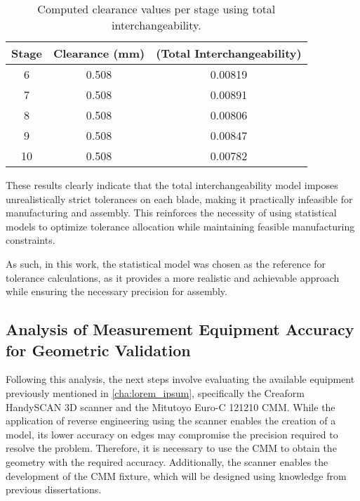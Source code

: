 \begin{table}[h]
    \centering
    \begin{tabular}{@{}ccc@{}}
        \toprule
        Stage & Clearance (mm) &  \newline (Total Interchangeability) \\
        \midrule
        6  & 0.508 & 0.00819    \\
        7  & 0.508 & 0.00891    \\
        8  & 0.508 & 0.00806    \\
        9  & 0.508 & 0.00847    \\
        10 & 0.508 & 0.00782    \\
        \bottomrule
    \end{tabular}
    \caption{Computed clearance values per stage using total interchangeability.}
    \label{tab:clearance_interchangeability}
\end{table}

These results clearly indicate that the total interchangeability model imposes unrealistically strict tolerances on each blade, making it practically infeasible for manufacturing and assembly. This reinforces the necessity of using statistical models to optimize tolerance allocation while maintaining feasible manufacturing constraints.

As such, in this work, the statistical model was chosen as the reference for tolerance calculations, as it provides a more realistic and achievable approach while ensuring the necessary precision for assembly.

\subsection{Analysis of Measurement Equipment Accuracy for Geometric Validation}
\label{subsec:equipment_validation}

Following this analysis, the next steps involve evaluating the available equipment previously mentioned in \ref{cha:lorem_ipsum}, specifically the Creaform HandySCAN 3D scanner and the Mitutoyo Euro-C 121210 \gls{CMM}. While the application of reverse engineering using the scanner enables the creation of a model, its lower accuracy on edges may compromise the precision required to resolve the problem. Therefore, it is necessary to use the CMM to obtain the geometry with the required accuracy. Additionally, the scanner enables the development of the CMM fixture, which will be designed using knowledge from previous dissertations.

